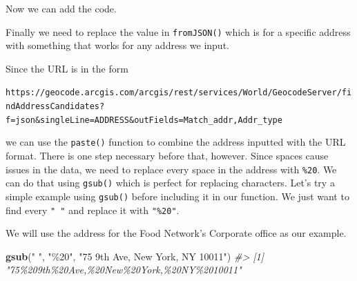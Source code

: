 \documentclass[
  12pt,
]{book}
\newenvironment{Shaded}{\begin{snugshade}}{\end{snugshade}}
\newcommand{\CommentTok}[1]{\textcolor[rgb]{0.37,0.37,0.37}{\textit{#1}}}
\newcommand{\ControlFlowTok}[1]{\textcolor[rgb]{0.27,0.27,0.27}{\textbf{#1}}}
\newcommand{\DecValTok}[1]{\textcolor[rgb]{0.06,0.06,0.06}{#1}}
\newcommand{\KeywordTok}[1]{\textcolor[rgb]{0.27,0.27,0.27}{\textbf{#1}}}
\newcommand{\NormalTok}[1]{#1}
\newcommand{\OperatorTok}[1]{\textcolor[rgb]{0.43,0.43,0.43}{\textbf{#1}}}
\newcommand{\StringTok}[1]{\textcolor[rgb]{0.5,0.5,0.5}{#1}}
\begin{document}
Now we can add the code.

\begin{Shaded}
\end{Shaded}

Finally we need to replace the value in \texttt{fromJSON()} which is for a specific address with something that works for any address we input.

Since the URL is in the form

\texttt{https://geocode.arcgis.com/arcgis/rest/services/World/GeocodeServer/findAddressCandidates?f=json\&singleLine=ADDRESS\&outFields=Match\_addr,Addr\_type}

we can use the \texttt{paste()} function to combine the address inputted with the URL format. There is one step necessary before that, however. Since spaces cause issues in the data, we need to replace every space in the address with \texttt{\%20}. We can do that using \texttt{gsub()} which is perfect for replacing characters. Let's try a simple example using \texttt{gsub()} before including it in our function. We just want to find every \texttt{"\ "} and replace it with \texttt{"\%20"}.

We will use the address for the Food Network's Corporate office as our example.

\begin{Shaded}
\begin{Highlighting}[]
\KeywordTok{gsub}\NormalTok{(}\StringTok{" "}\NormalTok{, }\StringTok{"\%20"}\NormalTok{, }\StringTok{"75 9th Ave, New York, NY 10011"}\NormalTok{)}
\CommentTok{\#> [1] "75\%209th\%20Ave,\%20New\%20York,\%20NY\%2010011"}
\end{Highlighting}
\end{Shaded}
\end{document}

